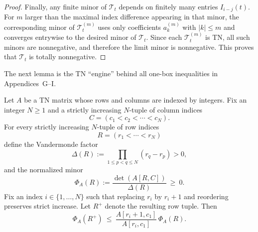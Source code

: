 \begin{proof}
Finally, any finite minor of $\mathcal T_t$ depends on finitely many entries $I_{i-j}(t)$.
For $m$ larger than the maximal index difference appearing in that minor, the corresponding minor of $\mathcal T_t^{(m)}$
uses only coefficients $a_k^{(m)}$ with $|k|\le m$ and converges entrywise to the desired minor of $\mathcal T_t$.
Since each $\mathcal T_t^{(m)}$ is TN, all such minors are nonnegative, and therefore the limit minor is nonnegative.
This proves that $\mathcal T_t$ is totally nonnegative.
\end{proof}

The next lemma is the TN ``engine'' behind all one-box inequalities in Appendices~G--I.

\begin{lemma}
\label{lem:TN_row_shift}
Let $A$ be a TN matrix whose rows and columns are indexed by integers.
Fix an integer $N\ge 1$ and a strictly increasing $N$-tuple of column indices
\begin{equation}
\label{eq:TN_fixed_columns}
C=(c_1<c_2<\cdots<c_N).
\end{equation}
For every strictly increasing $N$-tuple of row indices
\begin{equation}
\label{eq:TN_rows_R}
R=(r_1<\cdots<r_N)
\end{equation}
define the Vandermonde factor
\begin{equation}
\label{eq:TN_vandermonde}
\Delta(R):=\prod_{1\le p<q\le N}(r_q-r_p)>0,
\end{equation}
and the normalized minor
\begin{equation}
\label{eq:TN_phi_def}
\Phi_A(R):=\frac{\det(A[R,C])}{\Delta(R)}\ \ge\ 0.
\end{equation}
Fix an index $i\in\{1,\dots,N\}$ such that replacing $r_i$ by $r_i+1$ and reordering preserves strict increase.
Let $R^+$ denote the resulting row tuple.
Then
\begin{equation}
\label{eq:TN_row_shift_bound}
\Phi_A(R^+)\ \le\ \frac{A[r_i+1,c_1]}{A[r_i,c_1]}\,\Phi_A(R).
\end{equation}
\end{lemma}

